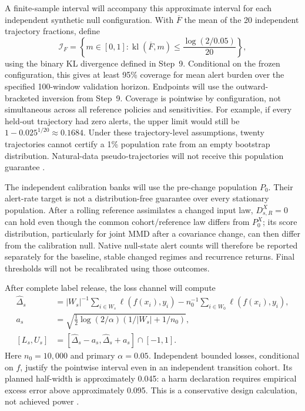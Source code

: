\documentclass[11pt,a4paper]{article}
\begin{document}
A finite-sample interval will accompany this approximate interval for each
independent synthetic null configuration. With $\overline F$ the mean of the
20 independent trajectory fractions, define
\begin{equation}
\mathcal I_F=\left\{m\in[0,1]:
\operatorname{kl}(\overline F,m)\leq\frac{\log(2/0.05)}{20}\right\},
\end{equation}
using the binary KL divergence defined in Step~9. Conditional on the frozen
configuration, this gives at least 95\% coverage for mean alert burden over
the specified 100-window validation horizon. Endpoints will use the
outward-bracketed inversion from Step~9. Coverage is pointwise by configuration,
not simultaneous across
all reference policies and sensitivities. For example, if every held-out
trajectory had zero alerts, the upper limit would still be
$1-0.025^{1/20}\approx0.1684$. Under these trajectory-level assumptions,
twenty trajectories cannot certify a 1\% population rate from an empty bootstrap
distribution. Natural-data pseudo-trajectories will not receive this
population guarantee \cite{hoeffding}.

The independent calibration banks will use the pre-change population $P_0$.
Their alert-rate target is not a distribution-free guarantee over every
stationary population. After a rolling reference assimilates a changed input
law, $D^X_{s,R}=0$ can hold even though the common cohort/reference law differs
from $P_0^X$; its score distribution, particularly for joint MMD after a
covariance change, can then differ
from the calibration null. Native null-state alert counts will therefore be
reported separately for the baseline, stable changed regimes and recurrence
returns. Final thresholds will not be recalibrated using those outcomes.

After complete label release, the loss channel will compute
\begin{align}
\widehat\Delta_s&=|W_s|^{-1}\sum_{i\in W_s}\ell(f(x_i),y_i)
-n_0^{-1}\sum_{i\in W_0}\ell(f(x_i),y_i),\\
a_s&=\sqrt{\tfrac12\log(2/\alpha)(1/|W_s|+1/n_0)},\\
[L_s,U_s]&=[\widehat\Delta_s-a_s,\widehat\Delta_s+a_s]\cap[-1,1].
\end{align}
Here $n_0=10{,}000$ and primary $\alpha=0.05$. Independent bounded losses,
conditional on $f$, justify the pointwise interval even in an independent
transition cohort. Its planned half-width is approximately 0.045: a harm
declaration requires empirical excess error above approximately 0.095. This is
a conservative design calculation, not achieved power \cite{hoeffding}.
\end{document}

